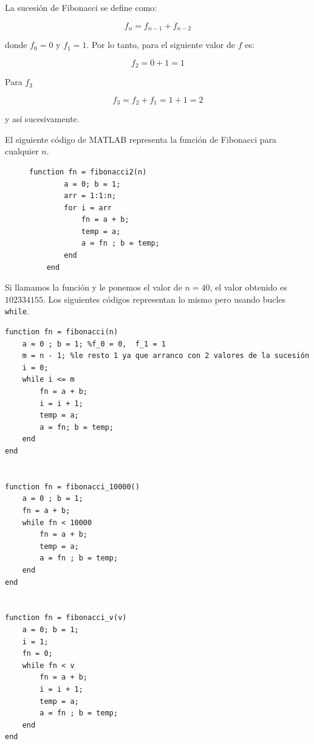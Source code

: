 La sucesión de Fibonacci se define como:

\begin{equation}
    f_n = f_{n-1} + f_{n-2}
\end{equation}


\noindent donde $f_0 = 0$ y $f_1 = 1$. Por lo tanto, para el siguiente valor de $f$ es:

\begin{equation*}
    f_2 = 0 + 1 = 1
\end{equation*}

\noindent Para $f_3$

\begin{equation*}
    f_3 = f_2 + f_1 = 1 + 1 = 2
\end{equation*}

\noindent y así sucesivamente.

El siguiente código de MATLAB representa la función de Fibonacci para cualquier $n$.

\begin{figure}[ht!]
    \centering
    \begin{lstlisting}[caption = {La función \texttt{fibonacci2} calcula el valor de la sucesión para un valor $n$}, label = {cod:1}]
    function fn = fibonacci2(n)
        a = 0; b = 1;
        arr = 1:1:n;
        for i = arr
            fn = a + b;
            temp = a;
            a = fn ; b = temp;
        end
    end
    \end{lstlisting}
\end{figure}

Si llamamos la función y le ponemos el valor de $n = 40$, el valor obtenido es $102334155$. Los siguientes códigos representan lo mismo pero usando bucles \texttt{while}.


\begin{lstlisting}[caption = {La función \texttt{fibonacci} representa la función para calcular los primeros $n$ valores de la sucesión. \texttt{fibonacci\_10000} calcula el valor de la sucesión una vez que es mayor a 10000. Por último, \texttt{fibonacci\_v} le pasamos como argumento un valor $v$ donde calculará el último valor de la sucesión cuando $f_n > v$.}, label = {cod:2}]
function fn = fibonacci(n)
    a = 0 ; b = 1; %f_0 = 0,  f_1 = 1
    m = n - 1; %le resto 1 ya que arranco con 2 valores de la sucesión
    i = 0;
    while i <= m
        fn = a + b;
        i = i + 1;
        temp = a;
        a = fn; b = temp;
    end
end


function fn = fibonacci_10000()
    a = 0 ; b = 1;
    fn = a + b;
    while fn < 10000
        fn = a + b;
        temp = a;
        a = fn ; b = temp;
    end
end


function fn = fibonacci_v(v)
    a = 0; b = 1;
    i = 1;
    fn = 0;
    while fn < v
        fn = a + b;
        i = i + 1;
        temp = a;
        a = fn ; b = temp;
    end
end
\end{lstlisting}




